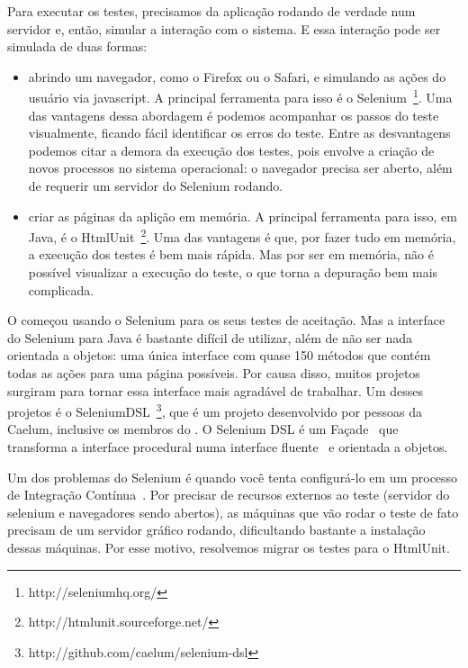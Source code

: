 Para executar os testes, precisamos da aplicação rodando de verdade num servidor e, então, simular a interação com 
o sistema. E essa interação pode ser simulada de duas formas:
\begin{itemize}
	\item{abrindo um navegador, como o Firefox ou o Safari, e simulando as ações do usuário via javascript. A principal
	ferramenta para isso é o Selenium~\footnote{http://seleniumhq.org/}. Uma das vantagens dessa abordagem é podemos
	acompanhar os passos do teste visualmente, ficando fácil identificar os erros do teste. Entre as desvantagens podemos
	citar a demora da execução dos testes, pois envolve a criação de novos processos no sistema operacional: o navegador
	precisa ser aberto, além de requerir um servidor do Selenium rodando.}
	\item{criar as páginas da aplição em memória. A principal ferramenta para isso, em Java, é o 
	HtmlUnit~\footnote{http://htmlunit.sourceforge.net/}. Uma das vantagens é que, por fazer tudo em memória, a execução
	dos testes é bem mais rápida. Mas por ser em memória, não é possível visualizar a execução do teste, o que torna
	a depuração bem mais complicada.}
\end{itemize}

O \calopsita começou usando o Selenium para os seus testes de aceitação. Mas a interface do Selenium para Java é bastante
difícil de utilizar, além de não ser nada orientada a objetos: uma única interface com quase 150 métodos que contém todas
as ações para uma página possíveis. Por causa disso, muitos projetos surgiram para tornar essa interface mais agradável
de trabalhar. Um desses projetos é o SeleniumDSL~\footnote{http://github.com/caelum/selenium-dsl}, que é um projeto 
\opensource desenvolvido por pessoas da Caelum, inclusive os membros do \calopsita. O Selenium DSL é um Façade~\cite{gof}
que transforma a interface procedural numa interface fluente~\cite{dsl} e orientada a objetos.

Um dos problemas do Selenium é quando você tenta configurá-lo em um processo de Integração Contínua~\cite{ci}. Por precisar
de recursos externos ao teste (servidor do selenium e navegadores sendo abertos), as máquinas que vão rodar o teste de fato
precisam de um servidor gráfico rodando, dificultando bastante a instalação dessas máquinas. Por esse motivo, resolvemos
migrar os testes para o HtmlUnit.

